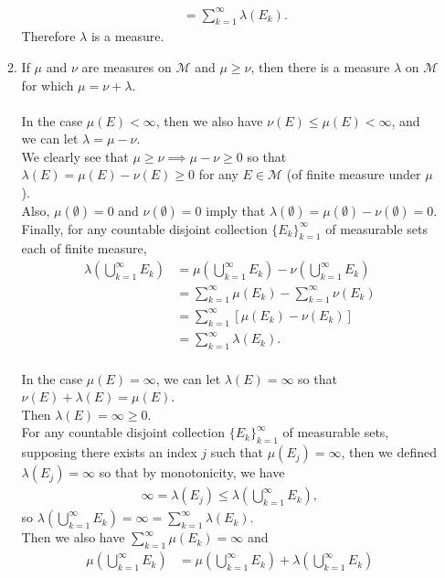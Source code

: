 \begin{enumerate}
\begin{enumerate}[label=(\roman*),align=left]
\begin{align*}
			&=\sum_{k=1}^\infty\lambda(E_k).
		\end{align*}
		Therefore $\lambda$ is a measure.
		\item If $\mu$ and $\nu$ are measures on $\mathcal{M}$ and $\mu\ge\nu$, then there is a measure $\lambda$ on $\mathcal{M}$ for which $\mu=\nu+\lambda$.\\
		\\In the case $\mu(E)<\infty$, then we also have $\nu(E)\le\mu(E)<\infty$, and we can let $\lambda = \mu-\nu$.
		\\We clearly see that $\mu\ge\nu\implies\mu-\nu\ge0$ so that $\lambda(E)=\mu(E)-\nu(E)\ge 0$ for any $E\in\mathcal{M}$ (of finite measure under $\mu$).
		\\Also, $\mu(\emptyset)= 0$ and $\nu(\emptyset)= 0$ imply that $\lambda(\emptyset)=\mu(\emptyset)-\nu(\emptyset)= 0$.
		\\Finally, for any countable disjoint collection $\{E_k\}_{k=1}^\infty$ of measurable sets each of finite measure,
		\begin{align*}
			\lambda\left(\bigcup_{k=1}^\infty E_k\right)&=\mu\left(\bigcup_{k=1}^\infty E_k\right)-\nu\left(\bigcup_{k=1}^\infty E_k\right)\\
			&=\sum_{k=1}^\infty\mu(E_k)-\sum_{k=1}^\infty\nu(E_k)\\
			&=\sum_{k=1}^\infty[\mu(E_k)-\nu(E_k)]\\
			&=\sum_{k=1}^\infty\lambda(E_k).
		\end{align*}
		\\In the case $\mu(E)=\infty$, we can let $\lambda(E) = \infty$ so that $\nu(E)+\lambda(E)=\mu(E)$.
		\\Then $\lambda(E)=\infty\ge0$.
		\\For any countable disjoint collection $\{E_k\}_{k=1}^\infty$ of measurable sets, supposing there exists an index $j$ such that $\mu(E_j)=\infty$, then we defined $\lambda(E_j) = \infty$ so that by monotonicity, we have
		\begin{align*}
			\infty=\lambda(E_j)\le\lambda\left(\bigcup_{k=1}^\infty E_k\right),
		\end{align*}
		so $\lambda\left(\bigcup_{k=1}^\infty E_k\right)=\infty=\sum_{k=1}^\infty\lambda(E_k)$.
		\\Then we also have $\sum_{k=1}^\infty\mu(E_k)=\infty$ and 
		\begin{align*}
			\mu\left(\bigcup_{k=1}^\infty E_k\right)&=\mu\left(\bigcup_{k=1}^\infty E_k\right)+\lambda\left(\bigcup_{k=1}^\infty E_k\right)\\

\end{align*}
\end{enumerate}
\end{enumerate}
